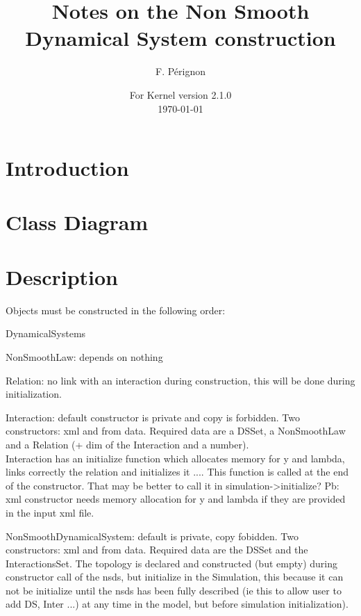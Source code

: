 \documentclass[10pt]{article}
\begin{document}
\thispagestyle{empty}
\title{Notes on the Non Smooth Dynamical System construction}
\author{F. P\'erignon}

\date{For Kernel version 2.1.0 \\
 \today}
\maketitle

\pagestyle{fancy}

\section{Introduction}

\section{Class Diagram}

\section{Description}

Objects must be constructed in the following order: 
\bei
\item DynamicalSystems
\item NonSmoothLaw: depends on nothing
\item Relation: no link with an interaction during construction, this will be done during initialization. 
\item Interaction: default constructor is private and copy is forbidden. Two constructors: xml and from data. Required data are a DSSet, a NonSmoothLaw and
a Relation (+ dim of the Interaction and a number). \\
Interaction has an initialize function which allocates memory for y and lambda, links correctly the relation and initializes it .... This function is called at the 
end of the constructor. That may be better to call it in simulation->initialize? Pb: xml constructor needs memory allocation for y and lambda if they are
provided in the input xml file. 
\item NonSmoothDynamicalSystem: default is private, copy fobidden. Two constructors: xml and from data. Required data are the DSSet and the InteractionsSet.
The topology is declared and constructed (but empty) during constructor call of the nsds, but initialize in the Simulation, this because it can not be initialize until the nsds has been fully described (ie this to allow user to add DS, Inter ...) at any time in the model, but before simulation initialization). 
\end{document}
